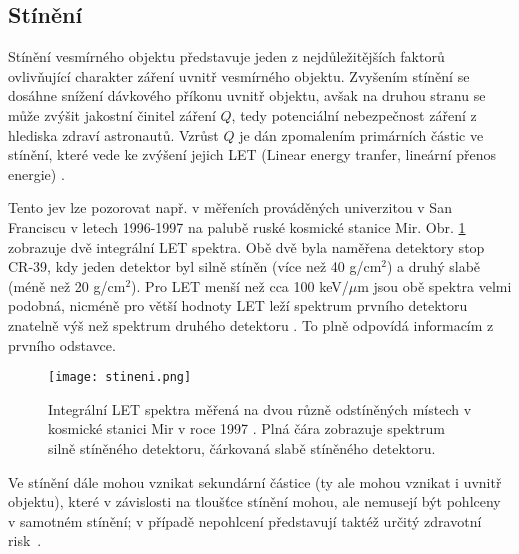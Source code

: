 \subsection{Stínění}\label{sec:kosmickeZareni_stineni}
Stínění vesmírného objektu představuje jeden z nejdůležitějších faktorů ovlivňující charakter záření uvnitř vesmírného objektu. Zvyšením stínění se dosáhne snížení dávkového příkonu uvnitř objektu, avšak na druhou stranu se může zvýšit jakostní činitel záření $Q$, tedy potenciální nebezpečnost záření z hlediska zdraví astronautů. Vzrůst $Q$ je dán zpomalením primárních částic ve stínění, které vede ke zvýšení jejich LET (Linear energy tranfer, lineární přenos energie) \cite{toNemecky}.

Tento jev lze pozorovat např. v měřeních prováděných univerzitou v San Franciscu v letech 1996-1997 na palubě ruské kosmické stanice Mir. Obr. \ref{fig:stineni} zobrazuje dvě integrální LET spektra. Obě dvě byla naměřena detektory stop CR-39, kdy jeden detektor byl silně stíněn (více než 40 g/cm$^2$) a druhý slabě (méně než 20 g/cm$^2$). Pro LET menší než cca 100 keV/$\mu$m jsou obě spektra velmi podobná, nicméně pro větší hodnoty LET leží spektrum prvního detektoru znatelně výš než spektrum druhého detektoru \cite{benton}. To plně odpovídá informacím z prvního odstavce.
\begin{figure}[H]
  \centering
  \texttt{[image: stineni.png]}
  \caption{Integrální LET spektra měřená na dvou různě odstíněných místech v kosmické stanici Mir v roce 1997 \cite{benton}. Plná čára zobrazuje spektrum silně stíněného detektoru, čárkovaná slabě stíněného detektoru.}
  \label{fig:stineni}
\end{figure}

Ve stínění dále mohou vznikat sekundární částice (ty ale mohou vznikat i uvnitř objektu), které v závislosti na tloušťce stínění mohou, ale nemusejí být pohlceny v samotném stínění; v případě nepohlcení představují taktéž určitý zdravotní risk~\cite{benton}. 


